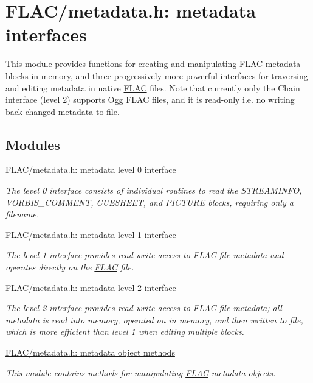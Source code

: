 \hypertarget{group__flac__metadata}{}\section{F\+L\+A\+C/metadata.h\+: metadata interfaces}
\label{group__flac__metadata}


This module provides functions for creating and manipulating \hyperlink{namespace_f_l_a_c}{F\+L\+AC} metadata blocks in memory, and three progressively more powerful interfaces for traversing and editing metadata in native \hyperlink{namespace_f_l_a_c}{F\+L\+AC} files. Note that currently only the Chain interface (level 2) supports Ogg \hyperlink{namespace_f_l_a_c}{F\+L\+AC} files, and it is read-\/only i.\+e. no writing back changed metadata to file.  


\subsection*{Modules}
\begin{DoxyCompactItemize}
\item 
\hyperlink{group__flac__metadata__level0}{F\+L\+A\+C/metadata.\+h\+: metadata level 0 interface}
\begin{DoxyCompactList}\small\item\em The level 0 interface consists of individual routines to read the S\+T\+R\+E\+A\+M\+I\+N\+FO, V\+O\+R\+B\+I\+S\+\_\+\+C\+O\+M\+M\+E\+NT, C\+U\+E\+S\+H\+E\+ET, and P\+I\+C\+T\+U\+RE blocks, requiring only a filename. \end{DoxyCompactList}\item 
\hyperlink{group__flac__metadata__level1}{F\+L\+A\+C/metadata.\+h\+: metadata level 1 interface}
\begin{DoxyCompactList}\small\item\em The level 1 interface provides read-\/write access to \hyperlink{namespace_f_l_a_c}{F\+L\+AC} file metadata and operates directly on the \hyperlink{namespace_f_l_a_c}{F\+L\+AC} file. \end{DoxyCompactList}\item 
\hyperlink{group__flac__metadata__level2}{F\+L\+A\+C/metadata.\+h\+: metadata level 2 interface}
\begin{DoxyCompactList}\small\item\em The level 2 interface provides read-\/write access to \hyperlink{namespace_f_l_a_c}{F\+L\+AC} file metadata; all metadata is read into memory, operated on in memory, and then written to file, which is more efficient than level 1 when editing multiple blocks. \end{DoxyCompactList}\item 
\hyperlink{group__flac__metadata__object}{F\+L\+A\+C/metadata.\+h\+: metadata object methods}
\begin{DoxyCompactList}\small\item\em This module contains methods for manipulating \hyperlink{namespace_f_l_a_c}{F\+L\+AC} metadata objects. \end{DoxyCompactList}\end{DoxyCompactItemize}


